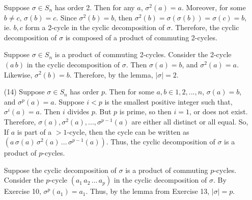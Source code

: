 \documentclass[12pt]{article}
\begin{document}
\begin{itemize}
Suppose $\sigma \in S_n$ has order 2. Then for any $a$, $\sigma^2(a) = a$. Moreover, for some $b \neq c$, $\sigma(b) = c$. Since $\sigma^2(b) = b$, then $\sigma^2(b) = \sigma(\sigma(b)) = \sigma(c) = b$, ie. $b, c$ form a 2-cycle in the cyclic decomposition of $\sigma$. Therefore, the cyclic decomposition of $\sigma$ is composed of a product of commuting 2-cycles.

Suppose $\sigma \in S_n$ is a product of commuting 2-cycles. Consider the 2-cycle $(a \, b)$ in the cyclic decomposition of $\sigma$. Then $\sigma(a) = b$, and $\sigma^2(a) = a$. Likewise, $\sigma^2(b) = b$. Therefore, by the lemma, $|\sigma| = 2$.
\item[(14)]
Suppose $\sigma \in S_n$ has order $p$. Then for some $a, b \in 1, 2, ..., n$, $\sigma(a) = b$, and $\sigma^p(a) = a$. Suppose $i < p$ is the smallest positive integer such that, $\sigma^i(a) = a$. Then $i$ divides $p$. But $p$ is prime, so then $i = 1$, or does not exist. Therefore, $\sigma(a), \sigma^2(a), ..., \sigma^{p-1}(a)$ are either all distinct or all equal. So, If $a$ is part of a $>1$-cycle, then the cycle can be written as $(a \, \sigma(a) \, \sigma^2(a) \, ... \, \sigma^{p-1}(a))$. Thus, the cyclic decomposition of $\sigma$ is a product of $p$-cycles.

Suppose the cyclic decomposition of $\sigma$ is a product of commuting $p$-cycles. Consider the $p$-cycle $(a_1 \, a_2 \, ... \, a_p)$ in the cyclic decomposition of $\sigma$. By Exercise 10, $\sigma^p(a_1) = a_1$. Thus, by the lemma from Exercise 13, $|\sigma| = p$.


\end{itemize}
\end{document}
